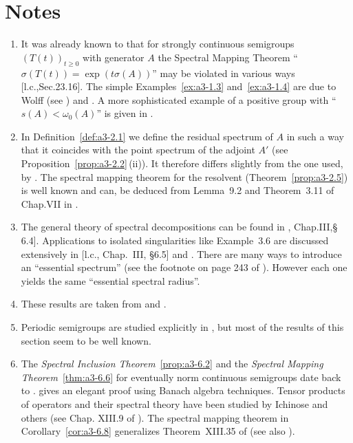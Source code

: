 \section*{Notes}\label{notes:a3-notes}
\begin{enumerate}[label=\emph{Section \arabic*:}, wide, itemsep=1ex]
\item 
It was already known to \textcite{hillephillips:1957} that for strongly continuous semigroups $(T(t))_{t\geq 0}$ with generator $A$ the Spectral Mapping Theorem \enquote{$\sigma(T(t)) = \exp(t\sigma(A))$} may be violated in various ways [l.c.,Sec.23.16].
The simple Examples~\ref{ex:a3-1.3} and~\ref{ex:a3-1.4} are due to Wolff (see \textcite{greinervoigtwolff:1981}) and \textcite{zabczyk:1975}.
A more sophisticated example of a positive group with 
\enquote{$s(A) < \omega_{0}(A)$} is given in \textcite{wolff:1981}.

\item 
In Definition~\ref{def:a3-2.1} we define the residual spectrum of\/ $A$ in such a way that it coincides with the point spectrum of the adjoint $A'$ (see Proposition~\ref{prop:a3-2.2}\,(ii)).
It therefore differs slightly from the one used, \eg by \textcite{schaefer:1974}.
The spectral mapping theorem for the resolvent (Theorem~\ref{prop:a3-2.5}) is well known and can, \eg be deduced from Lemma~9.2 and Theorem~3.11 of Chap.VII in \textcite{dunfordschwartz:1958}.

\item 
The general theory of spectral decompositions can be found in \textcite{kato:1976}, Chap.III,§ 6.4].
Applications to isolated singularities like Example~3.6 are discussed extensively in [l.c., Chap.~III, §6.5] and \textcite[Chap.~VIII, Sec.8]{yosida:1965}.
There are many ways to introduce an \enquote{essential spectrum} (see the footnote on page 243 of \textcite{kato:1976}).
However each one yields the same \enquote{essential spectral radius}.

\item 
These results are taken from \textcite{derndinger:1980} and \textcite{greiner:1981}.

\item 
Periodic semigroups are studied explicitly in \textcite{bart:1977}, but most of the results of this section seem to be well known.

\item
The \emph{Spectral Inclusion Theorem}~\ref{prop:a3-6.2} and the 
\emph{Spectral Mapping Theorem}~\ref{thm:a3-6.6} for eventually norm continuous semigroups date back to \textcite{hillephillips:1957}.
\textcite{davies:1980} gives an elegant proof using Banach algebra techniques.
Tensor products of operators and their spectral theory have been studied by Ichinose and others (see Chap. XIII.9 of \textcite{reedsimon:1978}).
The spectral mapping theorem in Corollary~\ref{cor:a3-6.8} generalizes Theorem~XIII.35 of \textcite{reedsimon:1978} (see also \textcite{herbst:1982}).


\end{enumerate}
